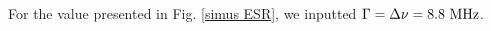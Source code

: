\documentclass[a4paper, 11pt]{book}
\begin{document}
For the value presented in Fig. \ref{simus ESR}, we inputted $\Gamma=\Delta \nu=8.8\ \rm MHz$.
%
%
%
%
\end{document}
